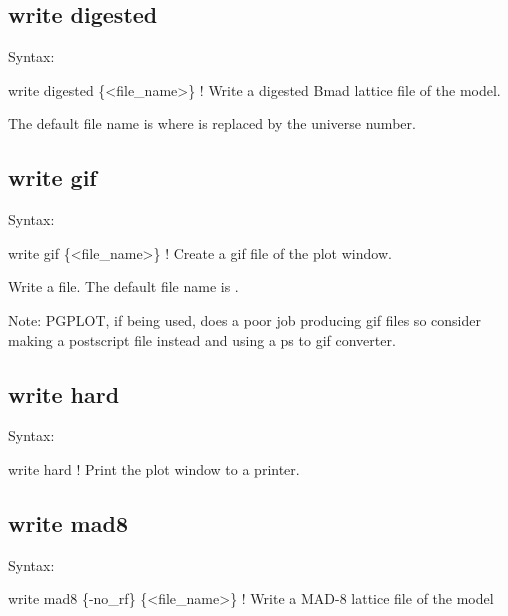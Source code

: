 {{{{{{{{{{{\subsection{write digested}
\label{s:write.digested}

Syntax:
\begin{example}
    write digested \{<file_name>\}      ! Write a digested Bmad lattice file of the model.
\end{example}

The default file name is  where \vn{\#} is replaced by the universe number. 



\subsection{write gif}
\label{s:write.gif}

Syntax:
\begin{example}
    write gif \{<file_name>\}           ! Create a gif file of the plot window.
\end{example}

Write a  file. The default file name is .

Note: PGPLOT, if being used, does a poor job producing gif files so consider making a
postscript file instead and using a ps to gif converter.


\subsection{write hard}
\label{s:write.hard}

Syntax:
\begin{example}
    write hard                        ! Print the plot window to a printer.
\end{example}


\subsection{write mad8}
\label{s:write.mad8}

Syntax:
\begin{example}
    write mad8 \{-no_rf\} \{<file_name>\}  ! Write a MAD-8 lattice file of the model
\end{example}

}}}}}}}}}}}
